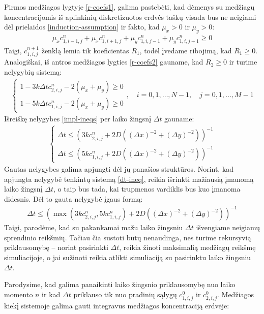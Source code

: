 Pirmos medžiagos lygtyje \eqref{r-coefs1}, galima pastebėti, kad dėmenys su medžiagų koncentracijomis iš aplinkinių diskretizuotos erdvės taškų visada bus ne neigiami dėl prielaidos \eqref{induction-assumption} ir fakto, kad $\mu_x>0$ ir $\mu_y>0$:
\begin{align*}
  \mu_xc^n_{1,i-1,j}+\mu_xc^n_{1,i+1,j}+\mu_yc^n_{1,i,j-1}+\mu_yc^n_{1,i,j+1}\geqslant 0
\end{align*}
\newpage
Taigi, $c^{n+1}_{1,i,j}$ ženklą lemia tik koeficientas $R_1$, todėl įvedame ribojimą, kad $R_1\geqslant 0$. Analogiškai, iš antros medžiagos lygties \eqref{r-coefs2} gauname, kad $R_2\geqslant 0$ ir turime nelygybių sistemą:
\begin{align} \label{impl-ineqs}
  \begin{cases}
    1-3k\Delta tc^{n}_{2,i,j}-2(\mu_x+\mu_y)\geqslant 0\\
    1-5k\Delta tc^{n}_{1,i,j}-2(\mu_x+\mu_y)\geqslant 0
  \end{cases}, \quad i=0,1,\dots,N-1, \quad j=0,1,\dots,M-1
\end{align}
Išreiškę nelygybes \eqref{impl-ineqs} per laiko žingsnį $\Delta t$ gauname:
\begin{align} \label{dt-ineq}
  \begin{cases}
    \Delta t \leqslant (3kc^{n}_{2,i,j}+2D((\Delta x)^{-2}+(\Delta y)^{-2}))^{-1}\\
    \Delta t \leqslant (5kc^{n}_{1,i,j}+2D((\Delta x)^{-2}+(\Delta y)^{-2}))^{-1}
  \end{cases}
\end{align}
Gautas nelygybes galima apjungti dėl jų panašios struktūros. Norint, kad apjungta nelygybė tenkintų sistemą \eqref{dt-ineq}, reikia išrinkti mažiausią įmanomą laiko žingsnį $\Delta t$, o taip bus tada, kai trupmenos vardiklis bus kuo įmanoma didesnis. Dėl to gauta nelygybė įgaus formą:
\begin{align}
  \Delta t \leqslant \left(\max(3kc^{n}_{2,i,j}, 5kc^{n}_{1,i,j})+2D\left((\Delta x)^{-2}+(\Delta y)^{-2}\right)\right)^{-1}
\end{align}
Taigi, parodėme, kad su pakankamai mažu laiko žingsniu $\Delta t$ išvengiame neigiamų sprendinio reikšmių. Tačiau čia sustoti būtų nenaudinga, nes turime rekursyvią priklausomybę -- norint pasirinkti $\Delta t$, reikia žinoti maksimalią medžiagų reikšmę simuliacijoje, o jai sužinoti reikia atlikti simuliaciją su pasirinktu laiko žingsniu $\Delta t$.

Parodysime, kad galima panaikinti laiko žingsnio priklausomybę nuo laiko momento $n$ ir kad $\Delta t$ priklauso tik nuo pradinių sąlygų $c^0_{1,i,j}$ ir $c^0_{2,i,j}$. Medžiagos kiekį sistemoje galima gauti integravus medžiagos koncentraciją erdvėje:

